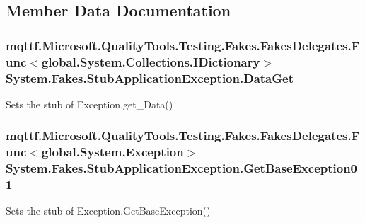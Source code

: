 \subsection{Member Data Documentation}
\hypertarget{class_system_1_1_fakes_1_1_stub_application_exception_a3063d719f74ab499640ffb4c40937e52}{
\subsubsection[{Data\-Get}]{\setlength{\rightskip}{0pt plus 5cm}mqttf.\-Microsoft.\-Quality\-Tools.\-Testing.\-Fakes.\-Fakes\-Delegates.\-Func$<$global.\-System.\-Collections.\-I\-Dictionary$>$ System.\-Fakes.\-Stub\-Application\-Exception.\-Data\-Get}}\label{class_system_1_1_fakes_1_1_stub_application_exception_a3063d719f74ab499640ffb4c40937e52}


Sets the stub of Exception.\-get\-\_\-\-Data()

\hypertarget{class_system_1_1_fakes_1_1_stub_application_exception_a8589e7b205b1d15e4387cb1d82a4a0e4}{
\subsubsection[{Get\-Base\-Exception01}]{\setlength{\rightskip}{0pt plus 5cm}mqttf.\-Microsoft.\-Quality\-Tools.\-Testing.\-Fakes.\-Fakes\-Delegates.\-Func$<$global.\-System.\-Exception$>$ System.\-Fakes.\-Stub\-Application\-Exception.\-Get\-Base\-Exception01}}\label{class_system_1_1_fakes_1_1_stub_application_exception_a8589e7b205b1d15e4387cb1d82a4a0e4}


Sets the stub of Exception.\-Get\-Base\-Exception()

